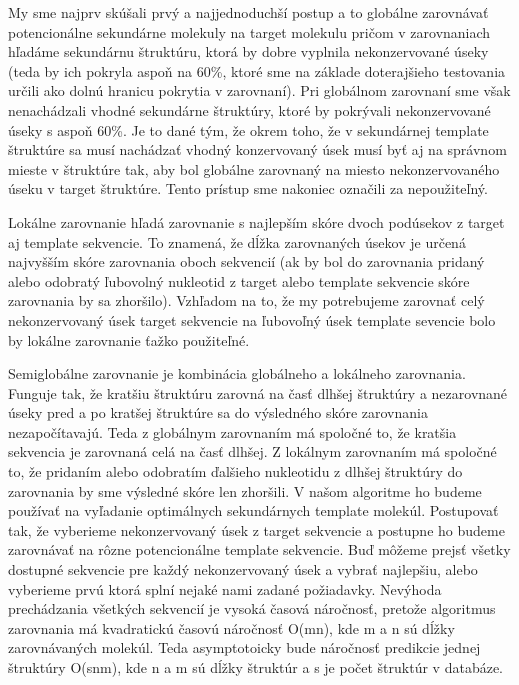 \indent My sme najprv skúšali prvý a najjednoduchší postup a to globálne zarovnávať potencionálne sekundárne molekuly na target molekulu pričom v zarovnaniach hľadáme sekundárnu štruktúru, ktorá by dobre vyplnila nekonzervované úseky (teda by ich pokryla aspoň na 60\%, ktoré sme na základe doterajšieho testovania určili ako dolnú hranicu pokrytia v zarovnaní). Pri globálnom zarovnaní sme však nenachádzali vhodné sekundárne štruktúry, ktoré by pokrývali nekonzervované úseky s aspoň 60\%. Je to dané tým, že okrem toho, že v sekundárnej template štruktúre sa musí nachádzať vhodný konzervovaný úsek musí byť aj na správnom mieste v štruktúre tak, aby bol globálne zarovnaný na miesto nekonzervovaného úseku v target štruktúre. Tento prístup sme nakoniec označili za nepoužiteľný.


\indent Lokálne zarovnanie hľadá zarovnanie s najlepším skóre dvoch podúsekov z target aj template sekvencie. To znamená, že dĺžka zarovnaných úsekov je určená najvyšším skóre zarovnania oboch sekvencií (ak by bol do zarovnania pridaný alebo odobratý ľubovolný nukleotid z target alebo template sekvencie skóre zarovnania by sa zhoršilo). Vzhľadom na to, že my potrebujeme zarovnať celý nekonzervovaný úsek target sekvencie na ľubovoľný úsek template sevencie bolo by lokálne zarovnanie ťažko použiteľné.


\indent Semiglobálne zarovnanie je kombinácia globálneho a lokálneho zarovnania. Funguje tak, že kratšiu štruktúru zarovná na časť dlhšej štruktúry a nezarovnané úseky pred a po kratšej štruktúre sa do výsledného skóre zarovnania nezapočítavajú. Teda z globálnym zarovnaním má spoločné to, že kratšia sekvencia je zarovnaná celá na časť dlhšej. Z lokálnym zarovnaním má spoločné to, že pridaním alebo odobratím ďalšieho nukleotidu z dlhšej štruktúry do zarovnania by sme výsledné skóre len zhoršili. V našom algoritme ho budeme používať na vyľadanie optimálnych sekundárnych template molekúl. Postupovať tak, že vyberieme nekonzervovaný úsek z target sekvencie a postupne ho budeme zarovnávať na rôzne potencionálne template sekvencie. Buď môžeme prejsť všetky dostupné sekvencie pre každý nekonzervovaný úsek a vybrať najlepšiu, alebo vyberieme prvú ktorá splní nejaké nami zadané požiadavky. Nevýhoda prechádzania všetkých sekvencií je vysoká časová náročnosť, pretože algoritmus zarovnania má kvadratickú časovú náročnosť O(mn), kde m a n sú dĺžky zarovnávaných molekúl. Teda asymptotoicky bude náročnosť predikcie jednej štruktúry O(snm), kde n a m sú dĺžky štruktúr a s je počet štruktúr v databáze. 


